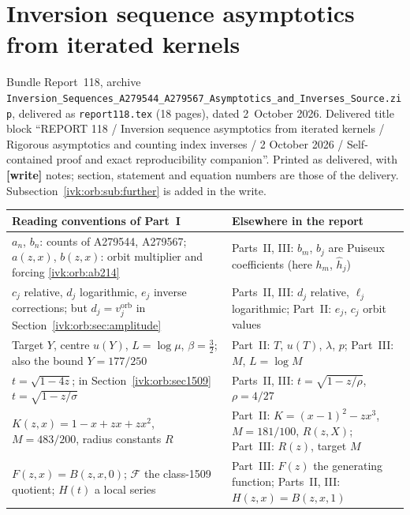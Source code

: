 \documentclass[11pt,letterpaper]{article}
\theoremstyle{remark}\newtheorem{remark}[theorem]{Remark}
\newcommand{\file}[1]{\nolinkurl{#1}}
\newcommand{\partsource}[1]{\par\noindent\begin{minipage}{\textwidth}\small #1\end{minipage}\par\medskip}
\begin{document}
\part{Inversion sequence asymptotics from iterated kernels}\label{ivk:orb:part}
\partsource{Bundle Report~118, archive \file{Inversion_Sequences_A279544_A279567_Asymptotics_and_Inverses_Source.zip}, delivered as \file{report118.tex} (18 pages), dated 2~October 2026. Delivered title block ``REPORT 118 / Inversion sequence asymptotics from iterated kernels / Rigorous asymptotics and counting index inverses / 2 October 2026 / Self-contained proof and exact reproducibility companion''. Printed as delivered, with \textbf{[write]} notes; section, statement and equation numbers are those of the delivery. Subsection~\ref{ivk:orb:sub:further} is added in the write.}
\begin{center}
\small
\begin{tabular}{@{}>{\raggedright\arraybackslash}p{} >{\raggedright\arraybackslash}p{}@{}}
\toprule
Reading conventions of Part~I & Elsewhere in the report\\
\midrule
$a_n$, $b_n$: counts of A279544, A279567; $a(z,x)$, $b(z,x)$: orbit multiplier and forcing \eqref{ivk:orb:ab214} & Parts~II, III: $b_m$, $b_j$ are Puiseux coefficients (here $h_m$, $\widehat h_j$)\\
$c_j$ relative, $d_j$ logarithmic, $e_j$ inverse corrections; but $d_j=v_j^{\mathrm{orb}}$ in Section~\ref{ivk:orb:sec:amplitude} & Parts~II, III: $d_j$ relative, $\ell_j$ logarithmic; Part~II: $e_j$, $c_j$ orbit values\\
Target $Y$, centre $u(Y)$, $L=\log\mu$, $\beta=\frac32$; also the bound $Y=177/250$ & Part~II: $T$, $u(T)$, $\lambda$, $p$; Part~III: $M$, $L=\log M$\\
$t=\sqrt{1-4z}$; in Section~\ref{ivk:orb:sec1509} $t=\sqrt{1-z/\sigma}$ & Parts~II, III: $t=\sqrt{1-z/\rho}$, $\rho=4/27$\\
$K(z,x)=1-x+zx+zx^2$, $M=483/200$, radius constants $R$ & Part~II: $K=(x-1)^2-zx^3$, $M=181/100$, $R(z,X)$; Part~III: $R(z)$, target $M$\\
$F(z,x)=B(z,x,0)$; $\mathcal F$ the class-1509 quotient; $H(t)$ a local series & Part~III: $F(z)$ the generating function; Parts~II, III: $H(z,x)=B(z,x,1)$\\
\bottomrule
\end{tabular}
\end{center}
\end{document}
